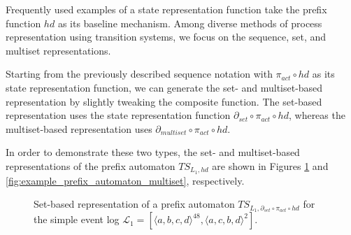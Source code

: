 Frequently used examples of a state representation function take the prefix function $\mathit{hd}$ as its baseline mechanism. Among diverse methods of process representation using transition systems, we focus on the sequence, set, and multiset representations. 

Starting from the previously described sequence notation with $\pi_{act} \circ \mathit{hd}$ as its state representation function, we can generate the set- and multiset-based representation by slightly tweaking the composite function. The set-based representation uses the state representation function $\partial_{set} \circ \pi_{act} \circ \mathit{hd}$, whereas the multiset-based representation uses $\partial_{multiset} \circ \pi_{act} \circ \mathit{hd}$.

In order to demonstrate these two types, the set- and multiset-based representations of the prefix automaton $\mathit{TS}_{L_1, hd}$ are shown in Figures \ref{fig:example_prefix_automaton_set} and \ref{fig:example_prefix_automaton_multiset}, respectively.

\begin{figure}[H]
    \centering
    \caption{Set-based representation of a prefix automaton $\mathit{TS}_{L_1, \partial_{set} \circ \pi_{act} \circ \mathit{hd}}$ for the simple event log $\mathcal{L}_1 = [ \langle a, b, c, d \rangle ^{48}, \langle a, c, b, d \rangle^2 ]$.}
    \label{fig:example_prefix_automaton_set}
\end{figure}

